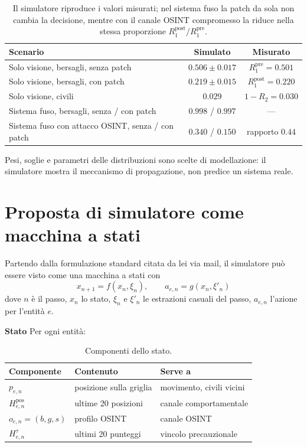 \documentclass[a4paper, 11pt]{article}
\begin{document}
\begin{table}[h]
\centering
\begin{tabular}{lcc}
\toprule
\textbf{Scenario} & \textbf{Simulato} & \textbf{Misurato} \\
\midrule
Solo visione, bersagli, senza patch & $0.506 \pm 0.017$ & $R_1^{\text{pre}} = 0.501$ \\
Solo visione, bersagli, con patch & $0.219 \pm 0.015$ & $R_1^{\text{post}} = 0.220$ \\
Solo visione, civili & $0.029$ & $1 - R_2 = 0.030$ \\
\midrule
Sistema fuso, bersagli, senza / con patch & $0.998$ / $0.997$ & --- \\
Sistema fuso con attacco OSINT, senza / con patch & $0.340$ / $0.150$ & rapporto $0.44$ \\
\bottomrule
\end{tabular}
\caption{Il simulatore riproduce i valori misurati; nel sistema fuso la patch
da sola non cambia la decisione, mentre con il canale OSINT compromesso la
riduce nella stessa proporzione $R_1^{\text{post}}/R_1^{\text{pre}}$.}
\end{table}

Pesi, soglie e parametri delle distribuzioni sono scelte di modellazione: il
simulatore mostra il meccanismo di propagazione, non predice un sistema reale.

\section{Proposta di simulatore come macchina a stati}

Partendo dalla formulazione standard citata da lei via mail, il simulatore può essere visto come una macchina a stati con
\begin{equation}
x_{n+1} = f(x_n, \xi_n), \qquad a_{e,n} = g(x_n, \xi'_n)
\end{equation}
dove $n$ è il passo, $x_n$ lo stato, $\xi_n$ e $\xi'_n$ le estrazioni casuali
del passo, $a_{e,n}$ l'azione per l'entità $e$.

\textbf{Stato} Per ogni entità:

\begin{table}[h]
\centering
\begin{tabular}{lll}
\toprule
\textbf{Componente} & \textbf{Contenuto} & \textbf{Serve a} \\
\midrule
$p_{e,n}$ & posizione sulla griglia & movimento, civili vicini \\
$H^{\text{pos}}_{e,n}$ & ultime 20 posizioni & canale comportamentale \\
$o_{e,n} = (b, g, s)$ & profilo OSINT & canale OSINT \\
$H^{\tau}_{e,n}$ & ultimi 20 punteggi & vincolo precauzionale \\
\bottomrule
\end{tabular}
\caption{Componenti dello stato.}
\end{table}
\end{document}
